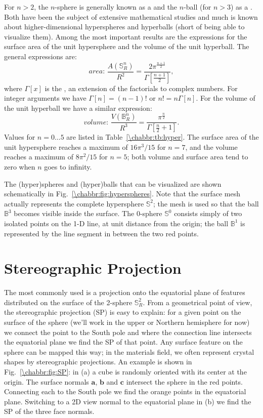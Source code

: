 For $n>2$, the $n$-sphere is generally known as a  and the $n$-ball (for $n>3$) as a .  Both have been the subject of extensive mathematical studies and much is known about higher-dimensional hyperspheres and hyperballs (short of being able to visualize them).  Among the most important results are the expressions for the surface area of the unit hypersphere and the volume of the unit hyperball.  The general expressions are:
\begin{equation}
	\textit{area: }\frac{A(\mathbb{S}^n_R)}{R^2} = \frac{2\pi^{\frac{n+1}{2}}}{\Gamma[\frac{n+1}{2}]},
\end{equation}
where $\Gamma[x]$ is the , an extension of the factorials to complex numbers.  For integer arguments we have $\Gamma[n]=(n-1)!$ or $n!=n\Gamma[n]$.  For the volume of the unit hyperball we have a similar expression:
\begin{equation}
	\textit{volume: }\frac{V(\mathbb{B}^n_R)}{R^3} = \frac{\pi^{\frac{n}{2}}}{\Gamma[\frac{n}{2}+1]}.
\end{equation}
Values for $n=0\ldots 5$ are listed in Table~\ref{\chabbr:tb:hyper}.  The surface area of the unit hypersphere reaches a maximum of $16\pi^3/15$ for $n=7$, and the volume reaches a maximum of $8\pi^2/15$ for $n=5$; both volume and surface area tend to zero when $n$ goes to infinity.

The (hyper)spheres and (hyper)balls that can be visualized are shown schematically in Fig.~\ref{\chabbr:fig:hyperspheres}.  Note that the surface mesh actually represents the complete hypersphere $\mathbb{S}^2$; the mesh is used so that the ball $\mathbb{B}^3$ becomes visible inside the surface. The $0$-sphere $\mathbb{S}^0$ consists simply of two isolated points on the 1-D line, at unit distance from the origin; the ball $\mathbb{B}^1$ is represented by the line segment in between the two red points.


\section{Stereographic Projection}
\label{\chabbr:sec:stereoproj}

The most commonly used  is a projection onto the equatorial plane of features distributed on the surface of the 2-sphere $\mathbb{S}^2_R$. From a geometrical point of view, the stereographic projection (SP) is easy to explain: for a given point on the surface of the sphere (we'll work in the upper or Northern hemisphere for now) we connect the point to the South pole and where the connection line intersects the equatorial plane we find the SP of that point.  Any surface feature on the sphere can be mapped this way; in the materials field, we often represent crystal shapes by stereographic projections.  An example is shown in Fig.~\ref{\chabbr:fig:SP}: in (a) a cube is randomly oriented with its center at the origin. The surface normals $\mathbf{a}$, $\mathbf{b}$ and $\mathbf{c}$ intersect the sphere in the red points. Connecting each to the South pole we find the orange points in the equatorial plane. Switching to a 2D view normal to the equatorial plane in (b) we find the SP of the three face normals.

